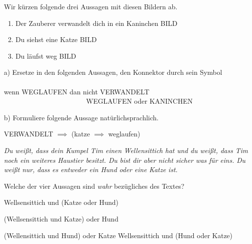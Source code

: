 \documentclass{uebungsblatt}
\begin{document}
\begin{exercise}

    Wir kürzen folgende drei Aussagen mit diesen Bildern ab.

    \begin{enumerate}
        \item Der Zauberer verwandelt dich in ein Kaninchen BILD
        \item Du siehst eine Katze BILD
        \item Du läufst weg BILD
    \end{enumerate}

    a) Ersetze in den folgenden Aussagen, den Konnektor durch sein Symbol
    \\ \\
        wenn WEGLAUFEN dan nicht VERWANDELT \ \ \ \ \ \ \ \ \ \ \ \  \ \ \
         \ \ \  \ \ \ \ \ \   WEGLAUFEN oder KANINCHEN  
    

    \begin{answerbox}[1in]
    \end{answerbox}


    b) Formuliere folgende Aussage natürlichsprachlich.

     VERWANDELT $\implies$ (katze $\implies$ weglaufen)

    \begin{answerbox}[1in]
    \end{answerbox}

\end{exercise}

\begin{exercise}

    \emph{Du weißt, dass dein Kumpel Tim einen Wellensittich hat und du weißt, dass 
    Tim noch ein weiteres Haustier besitzt. Du bist dir aber nicht sicher was für
    eins. Du weißt nur, dass es entweder ein Hund oder eine Katze ist.}

    Welche der vier Aussagen sind \emph{wahr} bezügliches des Textes?

    
    \begin{multicols}{2}
        \begin{multiplechoice}
            \citem Wellsensittich und (Katze oder Hund)
            \item (Wellsensittich und Katze) oder Hund
            \item (Wellensittich und Hund) oder Katze
            \citem Wellsensittich und (Hund oder Katze)
        \end{multiplechoice}
    \end{multicols}

\end{exercise}


\end{document}
